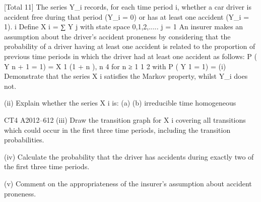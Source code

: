 [Total 11]
The series Y_i records, for each time period i, whether a car driver is accident free
during that period (Y_i = 0) or has at least one accident (Y_i = 1).
i
Define X i = ∑ Y j with state space {0,1,2,....}.
j = 1
An insurer makes an assumption about the driver’s accident proneness by considering
that the probability of a driver having at least one accident is related to the proportion
of previous time periods in which the driver had at least one accident as follows:
P ( Y n + 1 = 1) =
X
1
(1 + n ),
n
4
for
n ≥ 1
1
2
with P ( Y 1 = 1) =
(i) Demonstrate that the series X i satisfies the Markov property, whilst Y_i does
not.

(ii) Explain whether the series X i is:
(a)
(b)
irreducible
time homogeneous

CT4 A2012–612
(iii) Draw the transition graph for X i covering all transitions which could occur in
the first three time periods, including the transition probabilities.

(iv) Calculate the probability that the driver has accidents during exactly two of the
first three time periods.

(v) Comment on the appropriateness of the insurer’s assumption about accident
proneness.



